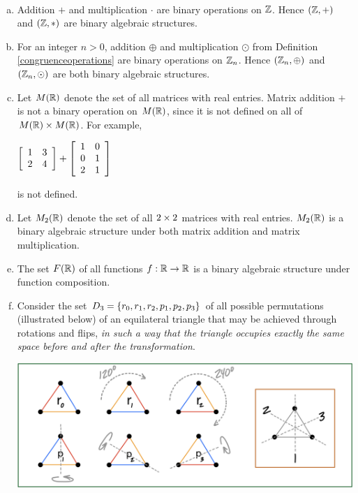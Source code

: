\documentclass[11pt,fleqn,dvipsnames,usenames]{article}
\begin{document}
\begin{examples}\label{basexamples}~
\begin{enumerate}[(a)]
\item Addition $+$ and multiplication $\cdot$ are binary operations on $\Z$.  Hence $(\Z,+)$ and $(\Z,*)$ are binary algebraic structures.
\item For an integer $n > 0$, addition $\oplus$ and multiplication $\odot$ from Definition \ref{congruenceoperations} are binary operations on $\ZN$.  Hence $(\ZN,\oplus)$ and $(\Z_{n},\odot)$ are both binary algebraic structures.
\item Let $M(\REAL)$ denote the set of all matrices with real entries.  Matrix addition $+$ is not a binary operation on $M(\REAL)$, since it is not defined on all of $M(\REAL)\times M(\REAL)$.  For example,
\begin{center}
$\MATRIX{rr}{1 & 3\\2 & 4} + \MATRIX{rr}{1 & 0\\0 & 1\\2 & 1}$
\end{center}
is not defined.
\item Let $M_{2}(\REAL)$ denote the set of all $2\BY 2$ matrices with real entries.  $M_{2}(\REAL)$ is a binary algebraic structure under both matrix addition and matrix multiplication.
\item The set $F(\REAL)$ of all functions $f:\REAL\to\REAL$ is a binary algebraic structure under function composition.
\item \label{dihedralgroup} Consider the set $D_3 = \SET{r_0,r_1,r_2,p_1,p_2,p_3}$ of all possible permutations (illustrated below) of an equilateral triangle that may be achieved through rotations and flips, \emph{in such a way that the triangle occupies exactly the same space before and after the transformation}.

\begin{center}
\includegraphics[width=0.9\linewidth]{permutationsoftriangle}
\end{center}


\end{enumerate}
\end{examples}
\end{document}
